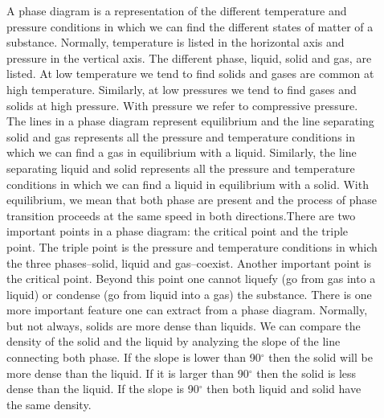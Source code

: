 \documentclass[main.tex]{subfiles}
\begin{document}
\begin{description}
\item[] 
A phase diagram is a representation of the different temperature and pressure conditions in which we can find the different states of matter of a substance. Normally, temperature is listed in the horizontal axis and pressure in the vertical axis. The different phase, liquid, solid and gas, are listed. At low temperature we tend to find solids and gases are common at high temperature. Similarly, at low pressures we tend to find gases and solids at high pressure. With pressure we refer to compressive pressure. 
The lines in a phase diagram represent equilibrium and the line separating solid and gas represents all the pressure and temperature conditions in which we can find a gas in equilibrium with a liquid. Similarly, the line separating liquid and solid represents all the pressure and temperature conditions in which we can find a liquid in equilibrium with a solid. With equilibrium, we mean that both phase are present and the process of phase transition proceeds at the same speed in both directions.There are two important points in a phase diagram: the critical point and the triple point. The triple point is the pressure and temperature conditions in which the three phases--solid, liquid and gas--coexist. Another important point is the critical point. Beyond this point one cannot liquefy (go from gas into a liquid) or condense (go from liquid into a gas) the substance. 
There is one more important feature one can extract from a phase diagram. Normally, but  not always, solids are more dense than liquids. We can compare the density of the solid and the liquid by analyzing the slope of the line connecting both phase. If the slope is lower than 90$^{\circ}$ then the solid will be more dense than the liquid. If it is larger than 90$^{\circ}$ then the solid is less dense than the liquid. If the slope is 90$^{\circ}$ then both liquid and solid have the same density.




\end{description}
\end{document}
